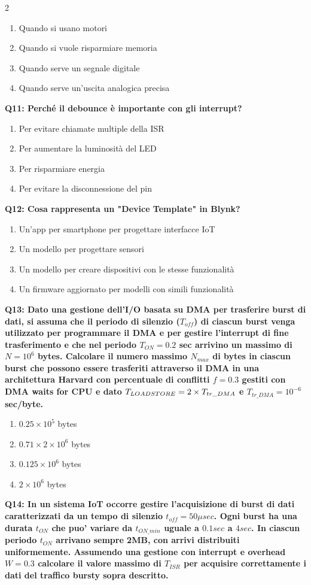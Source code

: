 \documentclass[10pt]{article}
\begin{document}
\begin{multicols}{2}
\begin{enumerate}[label=\arabic*.]
\item Quando si usano motori
\item Quando si vuole risparmiare memoria
\item Quando serve un segnale digitale
\item Quando serve un’uscita analogica precisa
\end{enumerate}
\textbf{Q11: Perché il debounce è importante con gli interrupt?}

\begin{enumerate}[label=\arabic*.]
\item Per evitare chiamate multiple della ISR
\item Per aumentare la luminosità del LED
\item Per risparmiare energia
\item Per evitare la disconnessione del pin
\end{enumerate}
\textbf{Q12: Cosa rappresenta un "Device Template" in Blynk?}

\begin{enumerate}[label=\arabic*.]
\item Un'app per smartphone per progettare interfacce IoT
\item Un modello per progettare sensori
\item Un modello per creare dispositivi con le stesse funzionalità
\item Un firmware aggiornato per modelli con simili funzionalità
\end{enumerate}
\textbf{Q13: Dato una gestione dell’I/O basata su DMA per trasferire burst di dati, si assuma che il periodo di silenzio  ($T_{off}$) di ciascun burst venga utilizzato per programmare il DMA e per gestire l’interrupt di fine trasferimento e che nel periodo $T_{ON} = 0.2$ sec arrivino un massimo di $N=10^6$ bytes. Calcolare il numero massimo $N_{max}$ di bytes in ciascun burst che possono essere trasferiti attraverso il DMA in una architettura Harvard con percentuale di conflitti $f = 0.3$ gestiti con DMA waits for CPU e dato $T_{LOAD\/STORE} = 2 \times T_{tr\_DMA}$ e $T_{tr\_DMA} = 10^{-6}$ sec/byte.}

\begin{enumerate}[label=\arabic*.]
\item $0.25 \times 10^5$ bytes
\item $0.71 \times 2 \times 10^6$ bytes
\item $0.125 \times 10^6$ bytes
\item $2 \times 10^6$ bytes
\end{enumerate}
\textbf{Q14: In un sistema IoT occorre gestire l'acquisizione di burst di dati caratterizzati da un tempo di silenzio $t_{off}=50\mu sec$. Ogni burst ha una durata $t_{ON}$ che puo' variare da $t_{ON\_min}$ uguale a $0.1 sec$ a $4 sec$. In ciascun periodo $t_{ON}$ arrivano sempre 2MB, con arrivi distribuiti uniformemente.  Assumendo una gestione con interrupt e overhead $W=0.3$ calcolare il valore massimo di $T_{ISR}$ per acquisire correttamente i dati del traffico bursty sopra descritto.}


\end{multicols}
\end{document}
